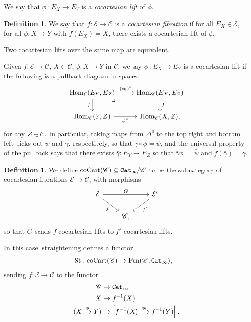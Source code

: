 \documentclass[12pt]{amsart}
\theoremstyle{definition}
\newtheorem{definition}[theorem]{Definition}
\providecommand{\St}{\text{St}}
\providecommand{\coCart}{\text{coCart}}
\begin{document}
We say that $\phi_!: E_X \to E_Y$ is a \textit{cocartesian lift} of $\phi$.


\begin{definition} We say that $f: \mathcal{E} \to \mathscr{C}$ is a \textit{cocartesian fibration} if for all $E_X \in \mathcal{E}$, for all $\phi: X \to Y$ with $f(E_X) = X$, there exists a cocartesian lift of $\phi$.
\end{definition}

Two cocartesian lifts over the same map are equivalent.

Given $f: \mathcal{E} \to \mathscr{C}$, $X\in \mathscr{C}$, $\phi: X \to Y$ in $\mathscr{C}$, we say $\phi_!: E_X \to E_Y$ is a cocartesian lift if the following is a pullback diagram in spaces:
\[ \begin{tikzcd}
    \Hom_\mathcal{E}(E_Y,E_Z)\rar["(\phi_!)^\ast" above]\dar["f" left]\pb & \Hom_\mathscr{C}(E_X,E_Z)\dar["f" right]\\
    \Hom_\mathscr{C}(Y,Z)\rar["\phi^\ast" below] & \Hom_\mathscr{C}(X,Z),
\end{tikzcd} \]
for any $Z\in \mathscr{C}$. In particular, taking maps from $\Delta^0$ to the top right and bottom left picks out $\bar{\psi}$ and $\gamma$, respectively, so that $\gamma\circ \phi = \psi$, and the universal property of the pullback says that there exists $\bar{\gamma}: E_Y \to E_Z$ so that $\bar{\gamma}\phi_! = \bar{\psi}$ and $f(\bar{\gamma}) = \gamma$.

\begin{definition} We define $\coCart(\mathscr{C}) \subseteq \Cat_\infty/\mathscr{C}$ to be the subcategory of cocartesian fibrations $\mathcal{E} \to \mathscr{C}$, with morphisms
\[ \begin{tikzcd}
    \mathcal{E}\ar[rr,"G" above]\ar[dr,"f" below left] &  & \mathcal{E}'\ar[dl,"f'" below right]\\
     & \mathscr{C}, & 
\end{tikzcd} \]
so that $G$ sends $f$-cocartesian lifts to $f'$-cocartesian lifts.
\end{definition}

In this case, straightening defines a functor
\begin{align*}
    \St: \coCart(\mathscr{C}) &\to \Fun(\mathscr{C},\Cat_\infty),
\end{align*}
sending $f: \mathcal{E} \to \mathscr{C}$ to the functor
\begin{align*}
    \mathscr{C} &\to \texttt{Cat}_\infty \\
    X &\mapsto f^{-1}(X) \\
    (X\xrightarrow{\phi} Y) &\mapsto \left[ f^{-1}(X) \xrightarrow{\phi_!} f^{-1}(Y) \right].
\end{align*}
\end{document}
